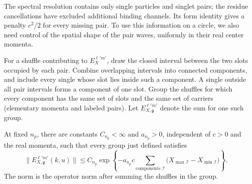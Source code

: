 The spectral resolution contains only single particles and singlet pairs;
the residue cancellations have excluded additional binding channels.
Its form identity gives a penalty \(c^2/2\) for every missing pair.
To use this information on a circle, we also need control of the spatial
shape of the pair waves, uniformly in their real center momenta.

For a shuffle contributing to \(E_X^{\ell'm'}\), draw the closed
interval between the two slots occupied by each pair.  Combine
overlapping intervals into connected components, and include every
single whose slot lies inside such a component.  A single outside
all pair intervals forms a component of one slot.  Group the
shuffles for which every component has the same set of slots and
the same set of carriers (elementary momenta and labeled pairs).
Let \(E_{X,\mathfrak g}^{\ell'm'}\) denote the sum for one such group.

\begin{lemma}
\label{lem:bethe-shuffle-decay}
At fixed \(n_p\), there are constants \(C_{n_p}<\infty\) and
\(a_{n_p}>0\), independent of \(c>0\) and the real momenta, such that
every group just defined satisfies
\begin{equation}
 \bigl\|E_{X,\mathfrak g}^{\ell'm'}(k,u)\bigr\|
 \leq C_{n_p}
 \exp\left\{-a_{n_p}c
       \sum_{\text{components }\mathcal I}
       \bigl(X_{\max\mathcal I}-X_{\min\mathcal I}\bigr)\right\}.
\label{eq:B11}
\end{equation}
The norm is the operator norm after summing the shuffles in the
group.
\end{lemma}

